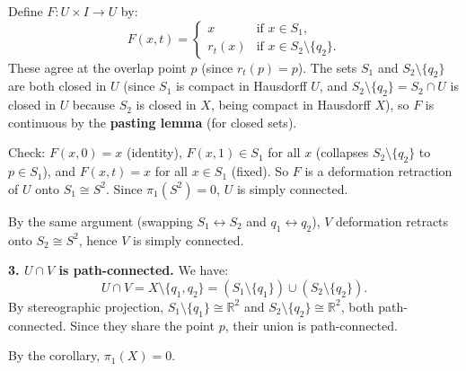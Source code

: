 \documentclass[11pt]{report}
\begin{document}
\begin{exbox}
Define $F: U \times I \to U$ by:
\[F(x, t) = \begin{cases} x & \text{if } x \in S_1, \\ r_t(x) & \text{if } x \in S_2 \setminus \{q_2\}. \end{cases}\]
These agree at the overlap point $p$ (since $r_t(p) = p$). The sets $S_1$ and $S_2 \setminus \{q_2\}$ are both closed in $U$ (since $S_1$ is compact in Hausdorff $U$, and $S_2 \setminus \{q_2\} = S_2 \cap U$ is closed in $U$ because $S_2$ is closed in $X$, being compact in Hausdorff $X$), so $F$ is continuous by the \textbf{pasting lemma} (for closed sets).

Check: $F(x, 0) = x$ (identity), $F(x, 1) \in S_1$ for all $x$ (collapses $S_2 \setminus \{q_2\}$ to $p \in S_1$), and $F(x, t) = x$ for all $x \in S_1$ (fixed). So $F$ is a deformation retraction of $U$ onto $S_1 \cong S^2$. Since $\pi_1(S^2) = 0$, $U$ is simply connected.

By the same argument (swapping $S_1 \leftrightarrow S_2$ and $q_1 \leftrightarrow q_2$), $V$ deformation retracts onto $S_2 \cong S^2$, hence $V$ is simply connected.

\textbf{3. $U \cap V$ is path-connected.} We have:
\[U \cap V = X \setminus \{q_1, q_2\} = (S_1 \setminus \{q_1\}) \cup (S_2 \setminus \{q_2\}).\]
By stereographic projection, $S_1 \setminus \{q_1\} \cong \mathbb{R}^2$ and $S_2 \setminus \{q_2\} \cong \mathbb{R}^2$, both path-connected. Since they share the point $p$, their union is path-connected.

By the corollary, $\pi_1(X) = 0$.
\end{exbox}
\end{document}
